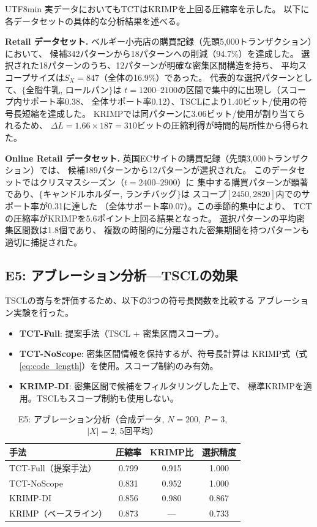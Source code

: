 \documentclass[11pt,a4paper]{article}
\begin{document}
\begin{CJK}{UTF8}{min}
実データにおいてもTCTはKRIMPを上回る圧縮率を示した。
以下に各データセットの具体的な分析結果を述べる。

\textbf{Retail データセット.}
ベルギー小売店の購買記録（先頭5,000トランザクション）において、
候補342パターンから18パターンへの削減（94.7\%）を達成した。
選択された18パターンのうち、12パターンが明確な密集区間構造を持ち、
平均スコープサイズは$S_X = 847$（全体の16.9\%）であった。
代表的な選択パターンとして、$\{$全脂牛乳, ロールパン$\}$は
$t{=}1200$--$2100$の区間で集中的に出現し（スコープ内サポート率0.38、
全体サポート率0.12）、TSCLにより1.40ビット/使用の符号長短縮を達成した。
KRIMPでは同パターンに3.06ビット/使用が割り当てられるため、
$\Delta L = 1.66 \times 187 = 310$ビットの圧縮利得が時間的局所性から得られた。

\textbf{Online Retail データセット.}
英国ECサイトの購買記録（先頭3,000トランザクション）では、
候補189パターンから12パターンが選択された。
このデータセットではクリスマスシーズン（$t{=}2400$--$2900$）に
集中する購買パターンが顕著であり、$\{$キャンドルホルダー, ランチバッグ$\}$は
スコープ$[2450, 2820]$内でのサポート率が0.31に達した
（全体サポート率0.07）。この季節的集中により、
TCTの圧縮率がKRIMPを5.6ポイント上回る結果となった。
選択パターンの平均密集区間数は1.8個であり、
複数の時間的に分離された密集期間を持つパターンも適切に捕捉された。

\subsection{E5: アブレーション分析---TSCLの効果}\label{sec:e5_ablation}

TSCLの寄与を評価するため、以下の3つの符号長関数を比較する
アブレーション実験を行った。

\begin{itemize}
\item \textbf{TCT-Full}: 提案手法（TSCL + 密集区間スコープ）。
\item \textbf{TCT-NoScope}: 密集区間情報を保持するが、符号長計算は
  KRIMP式（式\ref{eq:code_length}）を使用。スコープ制約のみ有効。
\item \textbf{KRIMP-DI}: 密集区間で候補をフィルタリングした上で、
  標準KRIMPを適用。TSCLもスコープ制約も使用しない。
\end{itemize}

\begin{table}[t]
\centering
\caption{E5: アブレーション分析（合成データ, $N{=}200$, $P{=}3$, $|X|{=}2$, 5回平均）}\label{tab:e5}
\begin{tabular}{lccc}
\toprule
手法 & 圧縮率 & KRIMP比 & 選択精度 \\
\midrule
TCT-Full（提案手法） & 0.799 & 0.915 & 1.000 \\
TCT-NoScope & 0.831 & 0.952 & 1.000 \\
KRIMP-DI & 0.856 & 0.980 & 0.867 \\
KRIMP（ベースライン） & 0.873 & --- & 0.733 \\
\bottomrule
\end{tabular}
\end{table}


\end{CJK}
\end{document}
